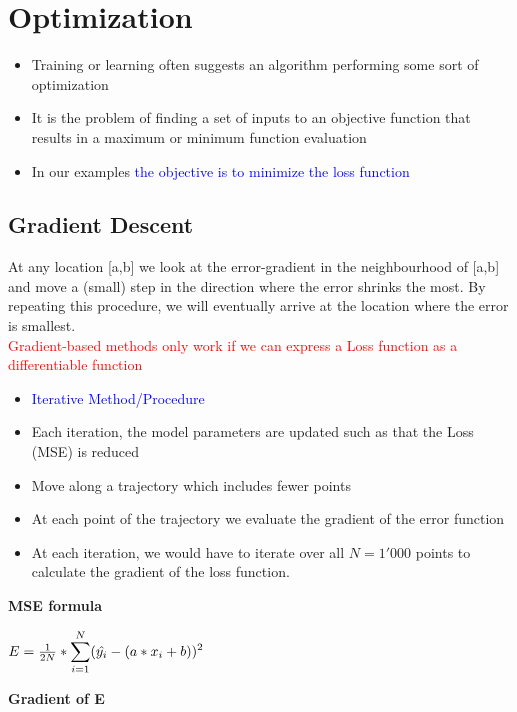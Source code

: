 \section{Optimization}
\begin{itemize}
    \item Training or learning often suggests an algorithm performing some sort of optimization
    \item It is the problem of finding a set of inputs to an objective function that results in a maximum or minimum function evaluation
    \item In our examples \textcolor{blue}{the objective is to minimize the loss function}
\end{itemize}

\subsection{Gradient Descent}
At any location [a,b] we look at the error-gradient in the neighbourhood of [a,b] and move a (small) step in the direction where the error shrinks the most.
By repeating this procedure, we will eventually arrive at the location where the error is smallest. \\

\textcolor{red}{Gradient-based methods only work if we can express a Loss function as a differentiable function} \\

\begin{itemize}
    \item \textcolor{blue}{Iterative Method/Procedure}
    \item Each iteration, the model parameters are updated such as that the Loss (MSE) is reduced
    \item Move along a trajectory which includes fewer points
    \item At each point of the trajectory we evaluate the gradient of the error function
    \item At each iteration, we would have to iterate over all $N = 1'000$ points to calculate the gradient of the loss function.
\end{itemize}

\textbf{MSE formula}
\begin{center}
    $E = \frac{1}{2N} * \large\displaystyle\sum_{i = 1}^{N}(\hat{y_i} - (a*x_i + b))^2$
\end{center}

\textbf{Gradient of E}

